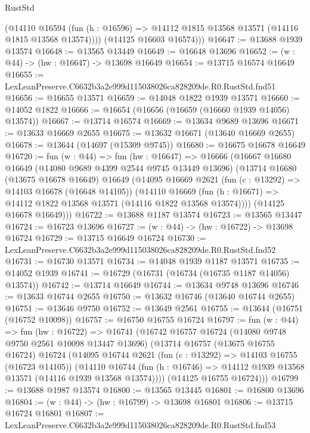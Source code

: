 \begin{lexlean}{RustStd}
\begin{coremodule}
          (@14110
            @16594
            (fun (h : @16596) => @14112 @1815 @13568 @13571 (@14116 @1815 @13568 @13574))))
        (@14125 @16603 @16574)))
@16647 := @13688 @1939 @13574
@16648 := @13565 @13449
@16649 := @16648 @13696
@16652 := (w : @44) -> (hw : @16647) -> @13698 @16649
@16654 := @13715 @16574 @16649
@16655 := LexLeanPreserve.C6632b3a2e999d115038026ca828209de.R0.RustStd.fnd51
@16656 := @16655 @13571
@16659 := @14048 @1822 @1939 @13571
@16660 := @14052 @1822
@16666 := @16654 (@16656 (@16659 (@16660 @1939 @14056) @13574))
@16667 := @13714 @16574
@16669 := @13634 @9689 @13696
@16671 := @13633 @16669 @2655
@16675 := @13632 @16671 (@13640 @16669 @2655)
@16678 := @13644 (@14697 (@15309 @9745))
@16680 := @16675 @16678 @16649
@16720 := fun (w : @44) =>
  fun (hw : @16647) =>
  @16666
    (@16667
      @16680
      @16649
      (@14080 @9689 @4399 @2544 @9745 @13449 @13696)
      (@13714
        @16680
        (@13675 @16678 @16649)
        @16649
        (@14095
          @16669
          @2621
          (fun (c : @13292) => @14103 @16678 (@16648 @14105))
          (@14110
            @16669
            (fun (h : @16671) => @14112 @1822 @13568 @13571 (@14116 @1822 @13568 @13574))))
        (@14125 @16678 @16649)))
@16722 := @13688 @1187 @13574
@16723 := @13565 @13447
@16724 := @16723 @13696
@16727 := (w : @44) -> (hw : @16722) -> @13698 @16724
@16729 := @13715 @16649 @16724
@16730 := LexLeanPreserve.C6632b3a2e999d115038026ca828209de.R0.RustStd.fnd52
@16731 := @16730 @13571
@16734 := @14048 @1939 @1187 @13571
@16735 := @14052 @1939
@16741 := @16729 (@16731 (@16734 (@16735 @1187 @14056) @13574))
@16742 := @13714 @16649
@16744 := @13634 @9748 @13696
@16746 := @13633 @16744 @2655
@16750 := @13632 @16746 (@13640 @16744 @2655)
@16751 := @13646 @9750
@16752 := @13649 @2561
@16755 := @13644 (@16751 (@16752 @10098))
@16757 := @16750 @16755 @16724
@16797 := fun (w : @44) =>
  fun (hw : @16722) =>
  @16741
    (@16742
      @16757
      @16724
      (@14080 @9748 @9750 @2561 @10098 @13447 @13696)
      (@13714
        @16757
        (@13675 @16755 @16724)
        @16724
        (@14095
          @16744
          @2621
          (fun (c : @13292) => @14103 @16755 (@16723 @14105))
          (@14110
            @16744
            (fun (h : @16746) => @14112 @1939 @13568 @13571 (@14116 @1939 @13568 @13574))))
        (@14125 @16755 @16724)))
@16799 := @13688 @1987 @13574
@16800 := @13565 @13445
@16801 := @16800 @13696
@16804 := (w : @44) -> (hw : @16799) -> @13698 @16801
@16806 := @13715 @16724 @16801
@16807 := LexLeanPreserve.C6632b3a2e999d115038026ca828209de.R0.RustStd.fnd53

\end{coremodule}
\end{lexlean}
